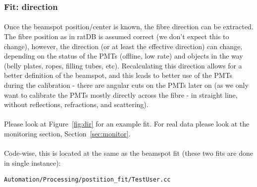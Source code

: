\documentclass[12pt]{article}
\begin{document}
\subsubsection{Fit: direction}\label{subsub:dir}
\paragraph{}
Once the beamspot position/center is known, the fibre direction can be extracted. The fibre position as in ratDB is assumed correct (we don't expect this to change), however, the direction (or at least the effective direction) can change, depending on the status of the PMTs (offline, low rate) and objects in the way (belly plates, ropes, filling tubes, etc). Recalculating this direction allows for a better definition of the beamspot, and this leads to better use of the PMTs during the calibration - there are angular cuts on the PMTs later on (as we only want to calibrate the PMTs mostly directly across the fibre - in straight line, without reflections, refractions, and scattering).

\paragraph{}
Please look at Figure~\ref{fig:dir} for an example fit. For real data please look at the monitoring section, Section~\ref{sec:monitor}. 

\paragraph{}
Code-wise, this is located at the same as the beamspot fit (these two fits are done in single instance):
\begin{lstlisting}
Automation/Processing/postition_fit/TestUser.cc
\end{lstlisting}
\end{document}
